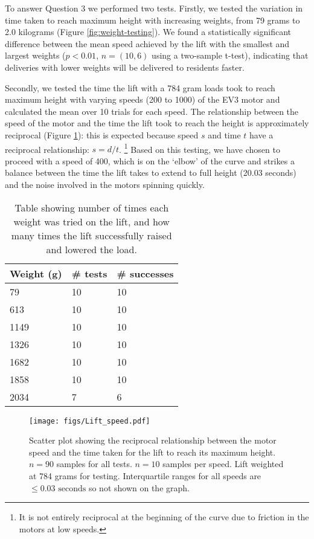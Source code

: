 \documentclass{article}
\begin{document}
To answer Question 3 we performed two tests. Firstly, we tested the variation in time taken to reach maximum height with increasing weights, from 79 grams to 2.0 kilograms (Figure \ref{fig:weight-testing}). We found a statistically significant difference between the mean speed achieved by the lift with the smallest and largest weights ($p < 0.01$, $n = (10, 6)$ using a two-sample t-test), indicating that deliveries with lower weights will be delivered to residents faster. 

Secondly, we tested the time the lift with a 784 gram loads took to reach maximum height with varying speeds (200 to 1000) of the EV3 motor and calculated the mean over 10 trials for each speed. The relationship between the speed of the motor and the time the lift took to reach the height is approximately reciprocal (Figure \ref{fig:speed-testing}): this is expected because speed $s$ and time $t$ have a reciprocal relationship: $s = d / t$. \footnote{It is not entirely reciprocal at the beginning of the curve due to friction in the motors at low speeds.} Based on this testing, we have chosen to proceed with a speed of 400, which is on the `elbow' of the curve and strikes a balance between the time the lift takes to extend to full height (20.03 seconds) and the noise involved in the motors spinning quickly.

\begin{table}
  \begin{center}
    \begin{tabular}{lll}
      {\bf Weight (g)} & {\bf \# tests} & {\bf \# successes} \\
      \hline
      79 &   10 & 10 \\
      613 &  10 & 10 \\
      1149 & 10 & 10 \\
      1326 & 10 & 10 \\
      1682 & 10 & 10 \\
      1858 & 10 & 10 \\
      2034 & 7 & 6
    \end{tabular}
    \caption{Table showing number of times each weight was tried on the lift, and how many times the lift successfully raised and lowered the load. }
    \label{tab:weight}
  \end{center}
\end{table}

\begin{figure}
  \begin{center}
    \texttt{[image: figs/Lift\_speed.pdf]}
    \caption{Scatter plot showing the reciprocal relationship between the motor speed and the time taken for the lift to reach its maximum height. $n = 90$ samples for all tests. $n = 10$ samples per speed. Lift weighted at 784 grams for testing. Interquartile ranges for all speeds are $\leq 0.03 \text{ seconds}$ so not shown on the graph.}
  \label{fig:speed-testing}
  \end{center}
\end{figure}
\end{document}
